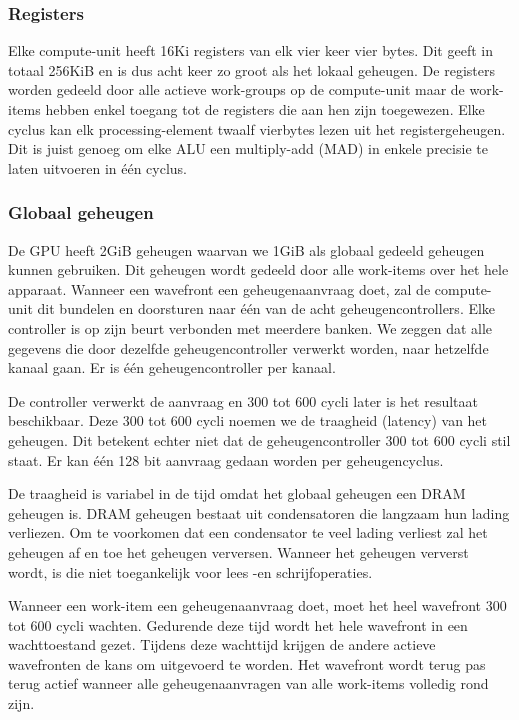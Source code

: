 \subsubsection{Registers}
Elke compute-unit heeft 16Ki registers van elk vier keer vier bytes. Dit geeft in totaal 256KiB en is dus acht keer zo groot als het lokaal geheugen. De registers worden gedeeld door alle actieve work-groups op de compute-unit maar de work-items hebben enkel toegang tot de registers die aan hen zijn toegewezen. Elke cyclus kan elk processing-element twaalf vierbytes lezen uit het registergeheugen. Dit is juist genoeg om elke ALU een multiply-add (MAD) in enkele precisie te laten uitvoeren in \'e\'en cyclus.

\subsubsection{Globaal geheugen}
De GPU heeft 2GiB geheugen waarvan we 1GiB als globaal gedeeld geheugen kunnen gebruiken. Dit geheugen wordt gedeeld door alle work-items over het hele apparaat. Wanneer een wavefront een geheugenaanvraag doet, zal de compute-unit dit bundelen en doorsturen naar \'e\'en van de acht geheugencontrollers. Elke controller is op zijn beurt verbonden met meerdere banken. We zeggen dat alle gegevens die door dezelfde geheugencontroller verwerkt worden, naar hetzelfde kanaal gaan. Er is \'e\'en geheugencontroller per kanaal.

De controller verwerkt de aanvraag en 300 tot 600 cycli later is het resultaat beschikbaar. Deze 300 tot 600 cycli noemen we de traagheid (latency) van het geheugen. Dit betekent echter niet dat de geheugencontroller 300 tot 600 cycli stil staat. Er kan \'e\'en 128 bit aanvraag gedaan worden per geheugencyclus.

De traagheid is variabel in de tijd omdat het globaal geheugen een DRAM geheugen is. DRAM geheugen bestaat uit condensatoren die langzaam hun lading verliezen. Om te voorkomen dat een condensator te veel lading verliest zal het geheugen af en toe het geheugen verversen. Wanneer het geheugen ververst wordt, is die niet toegankelijk voor lees -en schrijfoperaties.

Wanneer een work-item een geheugenaanvraag doet, moet het heel wavefront 300 tot 600 cycli wachten. Gedurende deze tijd wordt het hele wavefront in een wachttoestand gezet. Tijdens deze wachttijd krijgen de andere actieve wavefronten de kans om uitgevoerd te worden. Het wavefront wordt terug pas terug actief wanneer alle geheugenaanvragen van alle work-items volledig rond zijn.

